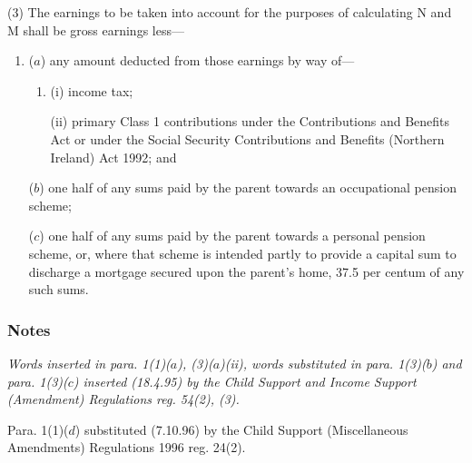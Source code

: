 \documentclass[a4paper]{article}
\newcommand\amendment[1]{\subsubsection*{Notes}{\itshape\frenchspacing\footnotesize #1 \par\goodbreak}}
\begin{document}
(3) The earnings to be taken into account for the purposes of calculating N and M shall be gross earnings less—
\begin{enumerate}\item[]
($a$) any amount deducted from those earnings by way of—
\begin{enumerate}\item[]
(i) income tax;

(ii) primary Class 1 contributions under the Contributions and Benefits Act
or under the Social Security Contributions and Benefits (Northern Ireland) Act 1992;  %
and
\end{enumerate}

($b$) one half of any sums paid by the parent towards an 
occupational pension scheme;  %

($c$) one half of any sums paid by the parent towards a personal pension scheme, or, where that scheme is intended partly to provide a capital sum to discharge a mortgage secured upon the parent’s home, 37.5 per centum of any such sums.
\end{enumerate}

\amendment{
Words inserted in para. 1(1)($a$), (3)($a$)(ii), words substituted in para. 1(3)($b$) and para. 1(3)($c$) inserted (18.4.95) by the Child Support and Income Support (Amendment) Regulations reg. 54(2), (3).

Para. 1(1)($d$) substituted (7.10.96) by the Child Support (Miscellaneous Amendments) Regulations 1996 reg. 24(2).
}

\medskip
\end{document}
